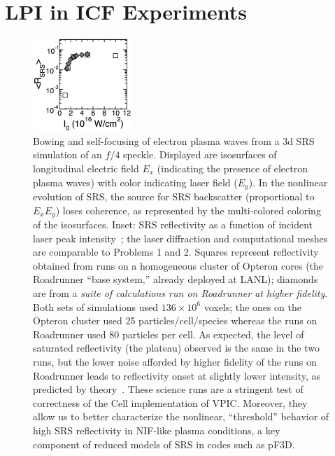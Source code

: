 \documentclass[journal,twoside]{IEEEtran}
\begin{document}
\section{LPI in ICF Experiments}

\begin{figure}
\begin{center}


\vspace{-1.5in}
\hspace{-5.25in}
\includegraphics[height=1.375in]{figs/lpi_comparison.eps}

\vspace{0.125in}
\caption{
Bowing and self-focusing of electron plasma waves from a 3d SRS
simulation of an $f/4$ speckle.  Displayed are isosurfaces of
longitudinal electric field $E_x$ (indicating the presence of electron
plasma waves) with color indicating laser field ($E_y$).  In the
nonlinear evolution of SRS, the source for SRS backscatter
(proportional to $E_x E_y$) loses coherence, as represented by the
multi-colored coloring of the isosurfaces.  Inset: SRS reflectivity as
a function of incident laser peak
intensity~\cite{AAC_Conference_Paper}; the laser diffraction and
computational meshes are comparable to Problems 1 and 2.  Squares
represent reflectivity obtained from runs on a homogeneous cluster of
Opteron cores (the Roadrunner ``base system,'' already deployed at 
LANL); diamonds are from a
\textit{suite of calculations run on Roadrunner at higher fidelity}.
Both sets of simulations used $136 \times 10^6$ voxels; the ones 
on the Opteron cluster used 25 particles/cell/species whereas the
runs on Roadrunner used 80 particles per cell.  
As expected, the level of saturated reflectivity (the plateau)
observed is the same in the two runs, but the lower noise afforded by
higher fidelity of the runs on Roadrunner leads to reflectivity onset
at slightly lower intensity, as predicted by
theory~\cite{Yin_et_al_Phys_Plasmas_2006}.  These science runs are a
stringent test of correctness of the Cell implementation of VPIC.
Moreover, they allow us to better characterize the nonlinear,
``threshold'' behavior of high SRS reflectivity in NIF-like plasma
conditions, a key component of reduced models of SRS in codes such as
pF3D.}
\label{fig:lpi}
\end{center}
\end{figure}
\end{document}
